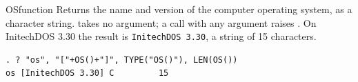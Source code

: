 \begin{XbaseEntry}{OS}{function}
Returns the name and version of the computer operating system, as a character string.
\Syntax
{}
\Usage
{} takes no argument; a call with any argument raises . On InitechDOS 3.30 the result is \texttt{InitechDOS 3.30}, a string of 15 characters.
\Examples
\begin{verbatim}
. ? "os", "["+OS()+"]", TYPE("OS()"), LEN(OS())
os [InitechDOS 3.30] C         15
\end{verbatim}
\end{XbaseEntry}

